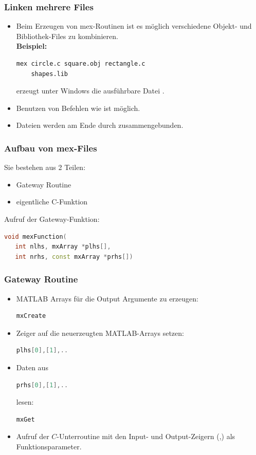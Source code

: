 \documentclass[hyperref={xetex}]{beamer}
\begin{document}
%
\begin{frame}[fragile]\frametitle{Linken mehrere Files}
\begin{itemize}
\item Beim Erzeugen von mex-Routinen ist es m\"oglich verschiedene Objekt- und
Bibliothek-Files zu kombinieren. \\
\textbf{Beispiel:}
\begin{lstlisting}
mex circle.c square.obj rectangle.c 
    shapes.lib
\end{lstlisting}
erzeugt unter Windows die ausf\"uhrbare Datei . \\

\item Benutzen von Befehlen wie 
ist m\"oglich. 

\item Dateien werden am Ende durch  zusammengebunden. 
\end{itemize}
\end{frame}
%
%
\begin{frame}[fragile]\frametitle{Aufbau von mex-Files}
Sie bestehen aus 2 Teilen:
\begin{itemize}
 \item  Gateway Routine
\item eigentliche C-Funktion
\end{itemize}
Aufruf der Gateway-Funktion:
\begin{lstlisting}[language=C++]
void mexFunction(
   int nlhs, mxArray *plhs[],
   int nrhs, const mxArray *prhs[])
\end{lstlisting}

\end{frame}
%
%
\begin{frame}[fragile]\frametitle{Gateway Routine}

\begin{itemize}
\item MATLAB Arrays f\"ur die Output Argumente zu erzeugen:
\begin{lstlisting}[language=C++]
mxCreate
\end{lstlisting}
\item Zeiger auf die neuerzeugten MATLAB-Arrays setzen:
\begin{lstlisting}[language=C++]
plhs[0],[1],..
\end{lstlisting}
\item Daten aus 
\begin{lstlisting}[language=C++]
prhs[0],[1],.. 
\end{lstlisting}
lesen:
\begin{lstlisting}[language=C++]
mxGet
\end{lstlisting}
\item Aufruf der $C$-Unterroutine mit den Input- und Output-Zeigern (,) als
  Funktionsparameter. 
\end{itemize}
\end{frame}
\end{document}
